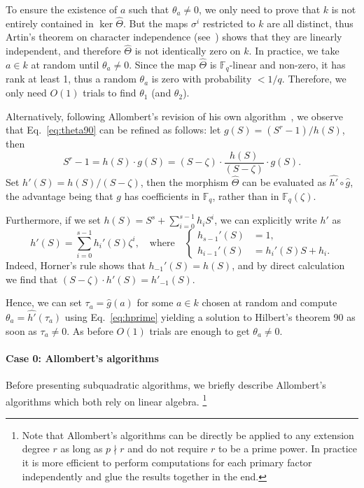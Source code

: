 \documentclass[12pt]{article}
\theoremstyle{plain}
\theoremstyle{definition}
\def\F{\ensuremath{\mathbb{F}}}
\newcounter{algorithm}
\begin{document}
To ensure the existence of $a$ such that $\theta_a\ne0$, we only need
to prove that $k$ is not entirely contained in $\ker\hat\Theta$. %
But the maps $\sigma^i$ restricted to $k$ are all distinct, thus
Artin's theorem on character independence (see~\cite[Ch~VI, Theorem~4.1]{lang})
shows that they are linearly 
independent, and therefore $\hat\Theta$ is not identically zero on $k$.
In practice, we take $a \in k$ at random until
$\theta_a\ne0$. Since the map $\hat\Theta$ is
$\F_q$-linear and non-zero, it has rank at least 1, thus a
random $\theta_a$ is zero with probability $< 1 / q$. Therefore, we only 
need $O(1)$ trials to find $\theta_1$ (and $\theta_2$).

Alternatively, following Allombert's revision of his own
algorithm~\cite{Allombert02-rev}, we observe that
Eq.~\eqref{eq:theta90} can be refined as follows: let
$g(S)=(S^r-1)/h(S)$, then
\begin{equation}
  \label{eq:theta90bis}
  S^r-1 = h(S)\cdot g(S) = (S-\zeta)\cdot \frac{h(S)}{(S-\zeta)} \cdot g(S).
\end{equation}
Set $h'(S)=h(S)/(S-\zeta)$, then the morphism $\hat\Theta$ can be evaluated
as $\hat{h'}\circ\hat{g}$, the advantage being that $g$ has
coefficients in $\F_q$, rather than in $\F_q(\zeta)$. %

Furthermore, if we set $h(S)=S^s+\sum_{i=0}^{s-1}h_iS^i$, we can
explicitly write $h'$ as
\begin{equation}
  \label{eq:hprime}
  h'(S)=\sum_{i=0}^{s-1}h_i'(S)\zeta^i,\quad
  \text{where}\quad
  \left\{\begin{aligned}
    h_{s-1}'(S) &= 1,\\
    h_{i-1}'(S) &= h_i'(S) S + h_i.
  \end{aligned}\right.
\end{equation}
Indeed, Horner's rule shows that $h_{-1}'(S)=h(S)$, and by direct
calculation we find that $(S-\zeta)\cdot h'(S) = h'_{-1}(S)$.

Hence, we can set $\tau_a = \hat{g}(a)$ for some $a\in k$ chosen at random
and compute $\theta_a = \hat{h'}(\tau_a)$ using Eq.~\eqref{eq:hprime}
yielding a solution to Hilbert's theorem 90 as soon as $\tau_a \neq 0$.
As before $O(1)$ trials are enough to get $\theta_a \neq 0$.

\paragraph{Case 0: Allombert's algorithms}
Before presenting subquadratic algorithms, we briefly describe
Allombert's algorithms which both rely on linear algebra.%
\footnote{
Note that Allombert's algorithms can be directly be applied to any extension
degree $r$ as long as $p \nmid r$
and do not require $r$ to be a prime power.
In practice it is more efficient to perform computations
for each primary factor independently
and glue the results together in the end.
}
\end{document}
